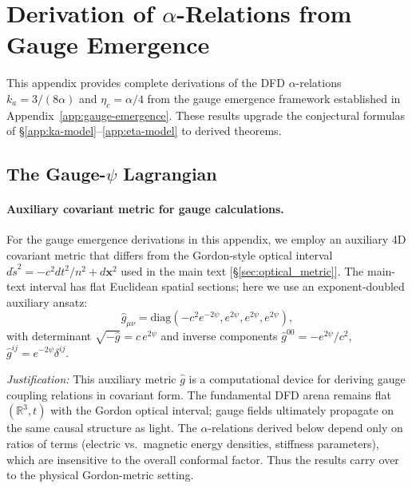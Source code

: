 
\section{Derivation of $\alpha$-Relations from Gauge Emergence}\label{app:alpha-derivations}

This appendix provides complete derivations of the DFD $\alpha$-relations $k_a = 3/(8\alpha)$ and $\eta_c = \alpha/4$ from the gauge emergence framework established in Appendix~\ref{app:gauge-emergence}. These results upgrade the conjectural formulas of \S\ref{app:ka-model}--\ref{app:eta-model} to derived theorems.

\subsection{The Gauge-$\psi$ Lagrangian}\label{app:gauge-psi-lagrangian}

\paragraph{Auxiliary covariant metric for gauge calculations.}
For the gauge emergence derivations in this appendix, we employ an auxiliary 
4D covariant metric that differs from the Gordon-style optical interval 
$d\tilde{s}^2 = -c^2 dt^2/n^2 + d\mathbf{x}^2$ used in the main text 
[\S\ref{sec:optical_metric}]. The main-text interval has flat Euclidean 
spatial sections; here we use an exponent-doubled auxiliary ansatz:
\begin{equation}
\hat{g}_{\mu\nu} = \text{diag}(-c^2 e^{-2\psi}, e^{2\psi}, e^{2\psi}, e^{2\psi}),
\end{equation}
with determinant $\sqrt{-\hat{g}} = c\,e^{2\psi}$ and inverse components 
$\hat{g}^{00} = -e^{2\psi}/c^2$, $\hat{g}^{ij} = e^{-2\psi}\delta^{ij}$.

\textit{Justification:} This auxiliary metric $\hat{g}$ is a computational 
device for deriving gauge coupling relations in covariant form. The fundamental 
DFD arena remains flat $(\mathbb{R}^3, t)$ with the Gordon optical interval; 
gauge fields ultimately propagate on the same causal structure as light.
The $\alpha$-relations derived below depend only on ratios of terms 
(electric vs.\ magnetic energy densities, stiffness parameters), which are 
insensitive to the overall conformal factor. Thus the results carry over to 
the physical Gordon-metric setting.

